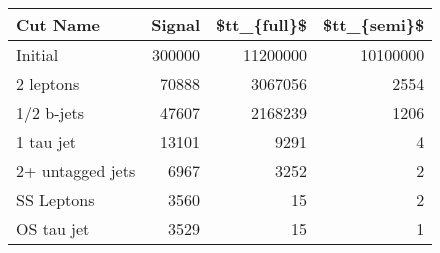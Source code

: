 \begin{tabular}{lrrr}
\toprule
         Cut Name &  Signal &  \$tt\_\{full\}\$ &  \$tt\_\{semi\}\$ \\
\midrule
          Initial &  300000 &     11200000 &     10100000 \\
        2 leptons &   70888 &      3067056 &         2554 \\
       1/2 b-jets &   47607 &      2168239 &         1206 \\
        1 tau jet &   13101 &         9291 &            4 \\
 2+ untagged jets &    6967 &         3252 &            2 \\
       SS Leptons &    3560 &           15 &            2 \\
       OS tau jet &    3529 &           15 &            1 \\
\bottomrule
\end{tabular}
